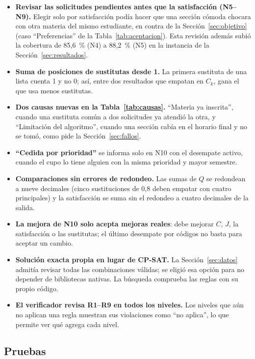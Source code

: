 \begin{itemize}
\item \textbf{Revisar las solicitudes pendientes antes que la satisfacción (N5--N9).} Elegir solo por satisfacción podía hacer que una sección cómoda chocara con otra materia del mismo estudiante, en contra de la Sección~\ref{sec:objetivo} (caso ``Preferencias'' de la Tabla~\ref{tab:aceptacion}). Esta revisión además subió la cobertura de 85,6~\% (N4) a 88,2~\% (N5) en la instancia de la Sección~\ref{sec:resultados}.
\item \textbf{Suma de posiciones de sustitutas desde 1.} La primera sustituta de una lista cuenta 1 y no 0; así, entre dos resultados que empatan en $C_k$, gana el que usa menos sustitutas.
\item \textbf{Dos causas nuevas en la Tabla~\ref{tab:causas}.} ``Materia ya inscrita'', cuando una sustituta común a dos solicitudes ya atendió la otra, y ``Limitación del algoritmo'', cuando una sección cabía en el horario final y no se tomó, como pide la Sección~\ref{sec:fallos}.
\item \textbf{``Cedida por prioridad''} se informa solo en N10 con el desempate activo, cuando el cupo lo tiene alguien con la misma prioridad y mayor semestre.
\item \textbf{Comparaciones sin errores de redondeo.} Las sumas de $Q$ se redondean a nueve decimales (cinco sustituciones de 0,8 deben empatar con cuatro principales) y la satisfacción se suma sin el redondeo a cuatro decimales de la salida.
\item \textbf{La mejora de N10 solo acepta mejoras reales}: debe mejorar $C$, $J$, la satisfacción o las sustitutas; el último desempate por códigos no basta para aceptar un cambio.
\item \textbf{Solución exacta propia en lugar de CP-SAT.} La Sección~\ref{sec:datos} admitía revisar todas las combinaciones válidas; se eligió esa opción para no depender de bibliotecas nativas. La búsqueda comprueba las reglas con su propio código.
\item \textbf{El verificador revisa R1--R9 en todos los niveles.} Los niveles que aún no aplican una regla muestran sus violaciones como ``no aplica'', lo que permite ver qué agrega cada nivel.
\end{itemize}

\subsection{Pruebas}\label{sec:pruebas}

